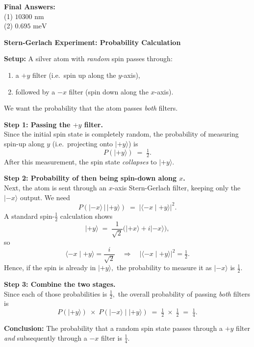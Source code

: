 \documentclass[12pt]{article}
\theoremstyle{definition} %
\theoremstyle{plain} %
\begin{document}
\vspace{1em}
\noindent \textbf{Final Answers:}\\
(1) $10300\text{ nm}$\\
(2) $0.695\text{ meV}$


\noindent
\textbf{Stern-Gerlach Experiment: Probability Calculation} 

\bigskip
\noindent
\textbf{Setup:} 
A silver atom with \emph{random} spin passes through:
\begin{enumerate}
    \item a $+y$ filter (i.e.\ spin up along the $y$-axis), 
    \item followed by a $-x$ filter (spin down along the $x$-axis).
\end{enumerate}
We want the probability that the atom passes \emph{both} filters.

\bigskip
\noindent
\textbf{Step 1: Passing the $+y$ filter.}\\
Since the initial spin state is completely random, the probability of measuring spin-up along $y$ (i.e.\ projecting onto $\lvert +y \rangle$) is
\[
P(\lvert +y\rangle) \;=\; \tfrac{1}{2}.
\]
After this measurement, the spin state \emph{collapses} to $\lvert +y\rangle$.

\bigskip
\noindent
\textbf{Step 2: Probability of then being spin-down along $x$.}\\
Next, the atom is sent through an $x$-axis Stern-Gerlach filter, keeping only the $\lvert -x\rangle$ output. 
We need
\[
P(\lvert -x\rangle \,\big\vert\, \lvert +y\rangle) 
\;=\; \bigl|\langle -x \mid +y\rangle \bigr|^2.
\]
A standard spin-$\tfrac12$ calculation shows 
\[
\lvert +y \rangle \;=\; 
    \frac{1}{\sqrt{2}}
    \bigl( \lvert +x\rangle + i\lvert -x\rangle \bigr),
\]
so 
\[
\langle -x \mid +y \rangle 
   = \frac{i}{\sqrt{2}} 
   \quad\Longrightarrow\quad
\bigl|\langle -x \mid +y \rangle \bigr|^2 
   = \tfrac{1}{2}.
\]
Hence, if the spin is already in $\lvert +y\rangle,$ the probability to measure it as $\lvert -x\rangle$ is $\frac12.$

\bigskip
\noindent
\textbf{Step 3: Combine the two stages.}\\
Since each of those probabilities is $\tfrac12,$ the overall probability of passing \emph{both} filters is
\[
P(\lvert +y\rangle)\;\times\;P(\lvert -x\rangle \mid \lvert +y\rangle)
\;=\;\tfrac12 \;\times\;\tfrac12 
\;=\;\boxed{\tfrac14}.
\]

\bigskip
\noindent
\textbf{Conclusion:} The probability that a random spin state passes through a $+y$ filter \emph{and} subsequently through a $-x$ filter is $\frac14.$
\end{document}
